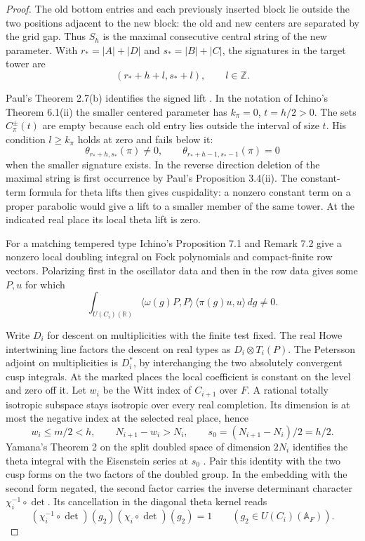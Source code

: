 \begin{proof}
The old bottom entries and each previously inserted block lie outside
the two positions adjacent to the new block: the old and new centers
are separated by the grid gap. Thus \(S_h\) is the maximal consecutive
central string of the new parameter. With
\(r_*=|A|+|D|\) and \(s_*=|B|+|C|\), the signatures in the target
tower are
\[
       (r_*+h+l,s_*+l),\qquad l\in\mathbb Z .
\]

Paul's Theorem 2.7(b) identifies the signed lift
\cite{paul-real-core}. In the notation of Ichino's Theorem 6.1(ii)
the smaller centered parameter has \(k_\pi=0\), \(t=h/2>0\).
The sets \(C^\pm_\pi(t)\) are empty because each old entry lies
outside the interval of size \(t\). His condition \(l\ge k_\pi\)
holds at zero and fails below it:
\[
     \theta_{r_*+h,s_*}(\pi)\ne0,\qquad
     \theta_{r_*+h-1,s_*-1}(\pi)=0
\]
when the smaller signature exists. In the reverse direction deletion
of the maximal string is first occurrence by Paul's Proposition 3.4(ii).
The constant-term formula for theta lifts then gives cuspidality:
a nonzero constant term on a proper parabolic would give a lift to
a smaller member of the same tower. At the indicated real place its
local theta lift is zero. \cite[Theorem 6.1]{ichino-real-core}
\cite[Sections 1.2 and 11.4]{gqt-rallis}

For a matching tempered
type Ichino's Proposition 7.1 and Remark 7.2 give a nonzero local
doubling integral on Fock polynomials and compact-finite row vectors.
Polarizing first in the oscillator data and then in the row data gives
some \(P,u\) for which
\[
   \int_{U(C_i)(\mathbb R)}
       \langle \omega(g)P,P\rangle\,
       \langle \pi(g)u,u\rangle\,dg\ne0.
\]

Write \(D_i\) for descent on multiplicities with the finite test fixed.
The real Howe intertwining line factors the descent on real types as
\(D_i\otimes T_i(P)\). The Petersson adjoint on multiplicities is
\(D_i^*\), by interchanging the two absolutely convergent cusp integrals.
At the marked places the local coefficient is constant on the level
and zero off it. 
Let \(w_i\) be the Witt index of \(C_{i+1}\) over \(F\).
A rational totally isotropic subspace stays isotropic over every real
completion. Its dimension is at most the negative index at the selected
real place, hence
\[
     w_i\le m/2<h,\qquad N_{i+1}-w_i>N_i,\qquad
                           s_0=(N_{i+1}-N_i)/2=h/2 .
\]
Yamana's Theorem 2 on the split doubled space of dimension \(2N_i\)
identifies the theta integral with the Eisenstein series at \(s_0\)
\cite{yamana-siegel-weil}. Pair this identity with the two cusp forms on the two factors of
the doubled group. In the embedding with the second form negated,
the second factor carries the inverse determinant character
\(\chi_i^{-1}\circ\det\). Its cancellation in the diagonal theta kernel reads
\[
 (\chi_i^{-1}\circ\det)(g_2)(\chi_i\circ\det)(g_2)=1
                \qquad(g_2\in U(C_i)(\mathbb A_F)).
\]


\end{proof}
